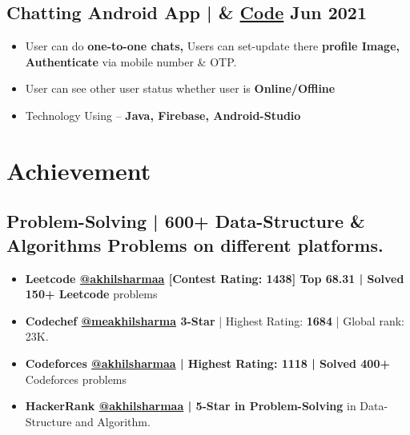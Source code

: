 \documentclass[a4,11pt]{article}
\newenvironment{zitemize}{
\begin{itemize}\itemsep0pt \parskip0pt \parsep1pt}
{\end{itemize}\vspace{-0.5cm}}
\begin{document}
    
\subsection{\large Chatting Android App | \faGithub & \normalfont \href{https://github.com/akhilsharmaa/Whatsapp-ChatApp}{Code}
\hfill{ Jun 2021}}
    \begin{zitemize}
        \item User can do \textbf{one-to-one chats,} Users can set-update there \textbf{profile Image, Authenticate} via mobile number \& OTP.
        \item User can see other user status whether user is \textbf{Online/Offline}
        \item Technology Using – \textbf{ Java, Firebase, Android-Studio}
    \end{zitemize}


\section{Achievement}
\vspace{0.1cm}

\subsection{\large{Problem-Solving} \normalfont | 600+ Data-Structure \& Algorithms Problems on different platforms.}

    \begin{zitemize}
        \item \textbf{Leetcode \href{https://leetcode.com/akhilsharmaa/}{@akhilsharmaa} [Contest Rating: 1438] Top 68.31 | Solved 150+ Leetcode} problems

         \item \textbf{Codechef \href{https://www.codechef.com/users/meakhilsharma}{@meakhilsharma}  \large{3-Star}} | Highest Rating: \textbf{1684} | Global rank: 23K.

         \item \textbf{Codeforces \href{https://codeforces.com/profile/akhilsharmaa}{@akhilsharmaa} | Highest Rating: 1118 |  Solved 400+} Codeforces problems 

         \item \textbf{HackerRank \href{https://www.hackerrank.com/akhilsharmaa}{@akhilsharmaa} | 5-Star in Problem-Solving} in Data-Structure and Algorithm.

    \end{zitemize}
    \vspace{0.4cm}
    
\end{document}
